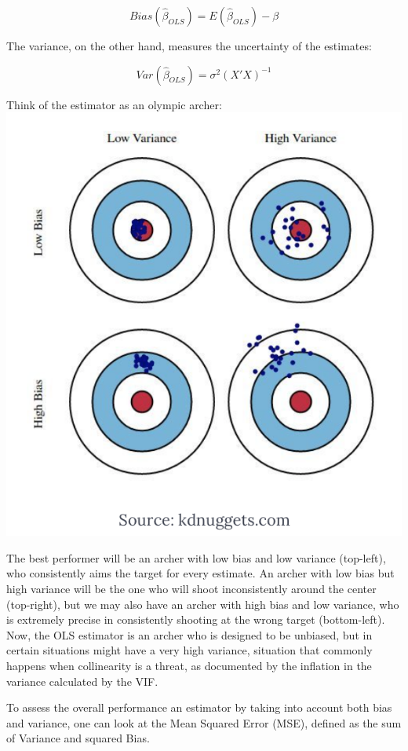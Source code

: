 \documentclass[
]{book}
\begin{document}
\[Bias(\hat{\beta}_{OLS})=E(\hat{\beta}_{OLS})-\beta\]

The variance, on the other hand, measures the uncertainty of the estimates:

\[Var(\hat{\beta}_{OLS})=\sigma^2(X'X)^{-1}\]

Think of the estimator as an olympic archer:
\includegraphics{images/archery.png}

The best performer will be an archer with low bias and low variance (top-left), who consistently aims the target for every estimate. An archer with low bias but high variance will be the one who will shoot inconsistently around the center (top-right), but we may also have an archer with high bias and low variance, who is extremely precise in consistently shooting at the wrong target (bottom-left). Now, the OLS estimator is an archer who is designed to be unbiased, but in certain situations might have a very high variance, situation that commonly happens when collinearity is a threat, as documented by the inflation in the variance calculated by the VIF.

To assess the overall performance an estimator by taking into account both bias and variance, one can look at the Mean Squared Error (MSE), defined as the sum of Variance and squared Bias.
\end{document}
